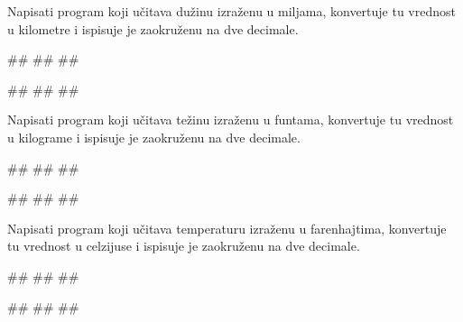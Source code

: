 \begin{Exercise}[label=p1.1_10a] 
Napisati program koji učitava dužinu izraženu
   u miljama, konvertuje tu vrednost u kilometre i ispisuje je zaokruženu na dve decimale. 
   
\begin{miditest}
\begin{upotreba}{1}
#\naslovInt#
##
##
\end{upotreba}
\end{miditest}  
\begin{miditest}
\begin{upotreba}{2}
#\naslovInt#
##
##
\end{upotreba}
\end{miditest}   

\end{Exercise}

\begin{Exercise}[label=p1.1_10b] 
Napisati program koji učitava težinu izraženu
   u funtama, konvertuje tu vrednost u kilograme i ispisuje je zaokruženu na dve decimale. 

\begin{miditest}
\begin{upotreba}{1}
#\naslovInt#
##
##
\end{upotreba}
\end{miditest}  
\begin{miditest}
\begin{upotreba}{2}
#\naslovInt#
##
##
\end{upotreba}
\end{miditest}   

\end{Exercise}

\begin{Exercise}[label=p1.1_10c] 
Napisati program koji učitava temperaturu izraženu
   u farenhajtima, konvertuje tu vrednost u celzijuse i ispisuje je zaokruženu na dve decimale. 
   
\begin{miditest}
\begin{upotreba}{1}
#\naslovInt#
##
##
\end{upotreba}
\end{miditest}  
\begin{miditest}
\begin{upotreba}{2}
#\naslovInt#
##
##
\end{upotreba}
\end{miditest}

\end{Exercise}

